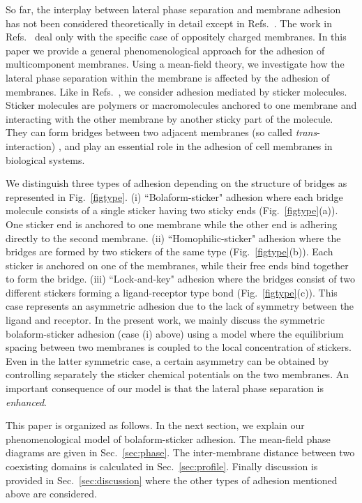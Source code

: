 So far, the interplay between lateral phase separation and
membrane adhesion has not been considered theoretically in detail
except in Refs.\ \cite{Lipowsky96,Lipowsky97,WNL}.
The work in Refs.\ \cite{NFBS,NBS} deal only with the specific
case of oppositely charged membranes.
In this paper we provide a general phenomenological approach for
the adhesion of multicomponent membranes.
Using a mean-field theory, we investigate how the lateral phase
separation within the membrane is affected by the adhesion of
membranes.
Like in Refs.\ \cite{Lipowsky96,Lipowsky97,WNL}, we consider adhesion
mediated by sticker molecules.
Sticker molecules are polymers or macromolecules anchored to one
membrane and interacting with the other membrane by another sticky
part of the molecule.
They can form bridges between two adjacent membranes
(so called {\it trans}-interaction) \cite{Lipowsky96},
and play an essential role in the adhesion of cell membranes
in biological systems.


We distinguish three types of adhesion depending on the structure
of bridges as represented in Fig.\ \ref{figtype}. (i)
``Bolaform-sticker" adhesion where each bridge molecule consists
of a single sticker having two sticky ends (Fig.\
\ref{figtype}(a)). One sticker end is anchored to one membrane
while the other end is adhering directly to the second membrane.
(ii) ``Homophilic-sticker" adhesion where the bridges are formed
by two stickers of the same type (Fig.\ \ref{figtype}(b)). Each
sticker is anchored on one of the membranes, while their free ends
bind together to form the bridge. (iii) ``Lock-and-key" adhesion
where the bridges consist of two different stickers forming a
ligand-receptor type bond (Fig.\ \ref{figtype}(c)). This case
represents an asymmetric adhesion due to the lack of symmetry
between the ligand and receptor. In the present work, we mainly
discuss the symmetric bolaform-sticker adhesion (case (i) above)
using a model where the equilibrium spacing between two membranes
is coupled to the local concentration of stickers. Even in the
latter symmetric case, a certain asymmetry can be obtained by
controlling separately the sticker chemical potentials on the two
membranes.
An important consequence of our model is that the lateral phase
separation is {\it enhanced}.


This paper is organized as follows.
In the next section, we explain our phenomenological model
of bolaform-sticker adhesion.
The mean-field phase diagrams are given in Sec.\ \ref{sec:phase}.
The inter-membrane distance  between two coexisting domains
is calculated in Sec.\ \ref{sec:profile}.
Finally discussion is provided in Sec.\ \ref{sec:discussion}
where the other types of adhesion mentioned above are considered.




